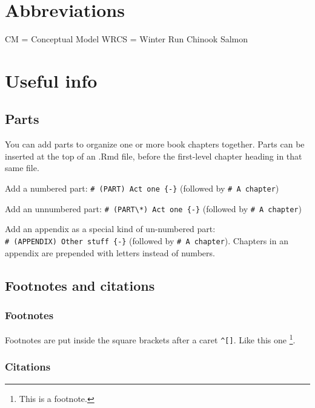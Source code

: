 \documentclass[
]{book}
\theoremstyle{definition}
\theoremstyle{definition}
\theoremstyle{definition}
\theoremstyle{definition}
\theoremstyle{remark}
\begin{document}
\hypertarget{abbreviations}{%
\chapter{Abbreviations}\label{abbreviations}}

CM = Conceptual Model
WRCS = Winter Run Chinook Salmon

\hypertarget{useful-info}{%
\chapter{Useful info}\label{useful-info}}

\hypertarget{parts}{%
\section{Parts}\label{parts}}

You can add parts to organize one or more book chapters together. Parts can be inserted at the top of an .Rmd file, before the first-level chapter heading in that same file.

Add a numbered part: \texttt{\#\ (PART)\ Act\ one\ \{-\}} (followed by \texttt{\#\ A\ chapter})

Add an unnumbered part: \texttt{\#\ (PART\textbackslash{}*)\ Act\ one\ \{-\}} (followed by \texttt{\#\ A\ chapter})

Add an appendix as a special kind of un-numbered part: \texttt{\#\ (APPENDIX)\ Other\ stuff\ \{-\}} (followed by \texttt{\#\ A\ chapter}). Chapters in an appendix are prepended with letters instead of numbers.

\hypertarget{footnotes-and-citations}{%
\section{Footnotes and citations}\label{footnotes-and-citations}}

\hypertarget{footnotes}{%
\subsection{Footnotes}\label{footnotes}}

Footnotes are put inside the square brackets after a caret \texttt{\^{}{[}{]}}. Like this one \footnote{This is a footnote.}.

\hypertarget{citations}{%
\subsection{Citations}\label{citations}}
\end{document}

